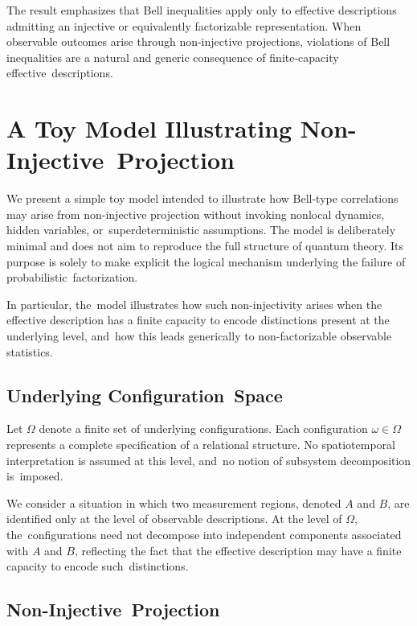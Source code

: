 \documentclass[quantumrep,article,accept,pdftex,oneauthor]{Definitions/mdpi}
\theoremstyle{remark}
\begin{document}
  The result emphasizes that Bell inequalities apply only to effective descriptions
  admitting an injective or equivalently factorizable representation.
  When observable outcomes arise through non-injective projections, violations of Bell
  inequalities are a natural and generic consequence of finite-capacity effective~descriptions.

  \section[\appendixname~\thesection]{A Toy Model Illustrating Non-Injective~Projection}
  \label{app:toy-model}

  We present a simple toy model intended to illustrate how Bell-type correlations may
  arise from non-injective projection without invoking nonlocal dynamics, hidden
  variables, or~superdeterministic assumptions.
  The model is deliberately minimal and does not aim to reproduce the full structure of quantum theory.
  Its purpose is solely to make explicit the logical mechanism underlying the failure
  of probabilistic~factorization.

  In particular, the~model illustrates how such non-injectivity arises when the
  effective description has a finite capacity to encode distinctions present at the
  underlying level, and~how this leads generically to non-factorizable observable
  statistics.

\subsection[\appendixname~\thesubsection]{Underlying Configuration~Space}
    \label{subsec:underlying-configuration-space}

    Let $\Omega$ denote a finite set of underlying configurations.
    Each configuration $\omega \in \Omega$ represents a complete specification of a relational structure.
    No spatiotemporal interpretation is assumed at this level, and~no notion of
    subsystem decomposition is~imposed.

    We consider a situation in which two measurement regions, denoted $A$ and $B$, are
    identified only at the level of observable descriptions.
    At the level of $\Omega$, the~configurations need not decompose into independent
    components associated with $A$ and $B$, reflecting the fact that the effective
    description may have a finite capacity to encode such~distinctions.

 \subsection[\appendixname~\thesubsection]{Non-Injective~Projection}
    \label{subsec:non-injective-projection}
\end{document}

